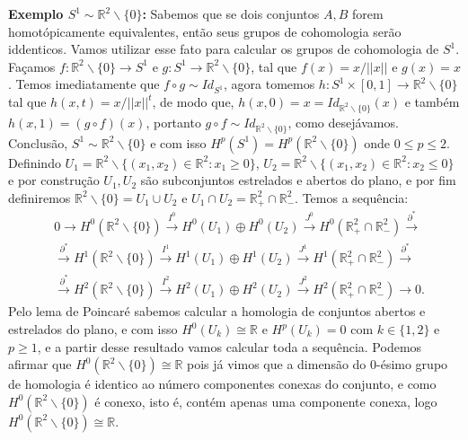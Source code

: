 \documentclass{article}
\begin{document}
	\vspace{2mm}
	\textbf{Exemplo $S^{1} \sim \mathbb{R}^{2} \backslash \{0\}$:} Sabemos que se dois conjuntos $A, B$ forem homotópicamente equivalentes, então seus grupos de cohomologia serão iddenticos. Vamos utilizar esse fato para calcular os grupos de cohomologia de $S^{1}$. Façamos $f: \mathbb{R}^{2} \backslash \{0\} \to S^{1}$ e $g: S^{1} \to \mathbb{R}^{2} \backslash \{0\}$, tal que $f(x) = x/||x||$ e $g(x) = x$. Temos imediatamente que $f \circ g \sim Id_{S^{1}}$, agora tomemos $h: S^{1} \times [0,1] \to \mathbb{R}^{2} \backslash \{0\}$ tal que 
	$h(x,t) = x/||x||^{t}$, de modo que, $h(x, 0) = x = Id_{\mathbb{R}^{2} \backslash \{0\}}(x)$ e também $h(x, 1) = (g \circ f)(x)$, portanto $g \circ f \sim Id_{\mathbb{R}^{2} \backslash \{0\}}$, como desejávamos. Conclusão, $S^{1} \sim \mathbb{R}^{2} \backslash \{0\}$ e com isso $H^{p}(S^{1}) = H^{p}(\mathbb{R}^{2} \backslash \{0\})$ onde $0 \leq p \leq 2$.
	Definindo $U_{1} = \mathbb{R}^{2} \backslash \{(x_{1}, x_{2}) \in \mathbb{R}^{2} : x_{1} \geq 0 \}$, $U_{2} = \mathbb{R}^{2} \backslash \{(x_{1}, x_{2}) \in \mathbb{R}^{2} : x_{2} \leq 0 \}$ e por construção $U_{1}, U_{2}$ são subconjuntos estrelados e abertos do plano, e por fim definiremos $\mathbb{R}^{2} \backslash \{0\} = U_{1} \cup U_{2}$ e $U_{1}\cap U_{2} = \mathbb{R}^{2}_{+} \cap \mathbb{R}^{2}_{-}$. Temos a sequência:
	$$
	\begin{aligned}
	& 0 \to H^{0}(\mathbb{R}^{2} \backslash \{0\} ) \xrightarrow{I^{0}} H^{0}(U_{1}) \oplus H^{0}(U_{2}) \xrightarrow{J^{0}} H^{0}(\mathbb{R}^{2}_{+} \cap \mathbb{R}^{2}_{-}) \xrightarrow{\partial^{*}} 
	\\
	&\xrightarrow{\partial^{*}} H^{1}(\mathbb{R}^{2} \backslash \{0\} ) \xrightarrow{I^{1}} H^{1}(U_{1}) \oplus H^{1}(U_{2}) \xrightarrow{J^{1}} H^{1}(\mathbb{R}^{2}_{+} \cap \mathbb{R}^{2}_{-}) \xrightarrow{\partial^{*}} 
	\\
	&\xrightarrow{\partial^{*}} H^{2}(\mathbb{R}^{2} \backslash \{0\} ) \xrightarrow{I^{2}} H^{2}(U_{1}) \oplus H^{2}(U_{2}) \xrightarrow{J^{2}} H^{2}(\mathbb{R}^{2}_{+} \cap \mathbb{R}^{2}_{-}) \to 0.
	\end{aligned}
	$$
	Pelo lema de Poincaré sabemos calcular a homologia de conjuntos abertos e estrelados do plano, e com isso $H^{0}(U_{k}) \cong \mathbb{R}$ e $H^{p}(U_{k}) = 0$ com $k \in \{1,2\}$ e $p\geq 1$, e a partir desse resultado vamos calcular toda a sequência. Podemos afirmar que $H^{0}(\mathbb{R}^{2} \backslash \{0\}) \cong \mathbb{R}$ pois já vimos que a dimensão do 0-ésimo grupo de homologia é identico ao número componentes conexas do conjunto, e como $H^{0}(\mathbb{R}^{2} \backslash \{0\} )$ é conexo, isto é, contém apenas uma componente conexa, logo $H^{0}(\mathbb{R}^{2} \backslash \{0\}) \cong \mathbb{R}$. 
	
\end{document}
